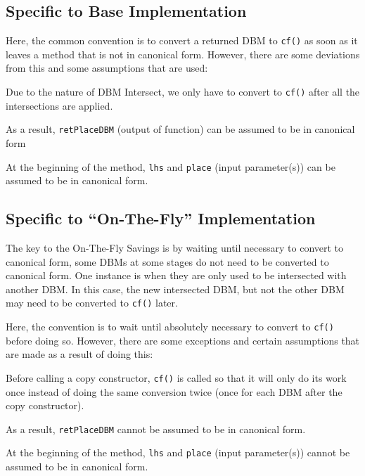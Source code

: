 \documentclass[11pt]{article}
\begin{document}
\subsection{Specific to Base Implementation}

	Here, the common convention is to convert a returned DBM to \texttt{cf()} as soon as it leaves a method that is not in canonical form.  However, there are some deviations from this and some assumptions that are used:
	
	\begin{enumeratepf}
		\item Due to the nature of DBM Intersect, we only have to convert to \texttt{cf()} after all the intersections are applied.
		\item As a result, \texttt{retPlaceDBM} (output of function) can be assumed to be in canonical form
		\item At the beginning of the method, \texttt{lhs} and \texttt{place} (input parameter(s)) can be assumed to be in canonical form.
	\end{enumeratepf}

\subsection{Specific to ``On-The-Fly'' Implementation}
	The key to the On-The-Fly Savings is by waiting until necessary to convert to canonical form, some DBMs at some stages do not need to be converted to canonical form.  One instance is when they are only used to be intersected with another DBM.  In this case, the new intersected DBM, but not the other DBM may need to be converted to \texttt{cf()} later. \parspc
	
	Here, the convention is to wait until absolutely necessary to convert to \texttt{cf()} before doing so.  However, there are some exceptions and certain assumptions that are made as  a result of doing this:
	
	\begin{enumeratepf}
		\item Before calling a copy constructor, \texttt{cf()} is called so that it will only do its work once instead of doing the same conversion twice (once for each DBM after the copy constructor).
		\item As a result, \texttt{retPlaceDBM} cannot be assumed to be in canonical form.
		\item At the beginning of the method, \texttt{lhs} and \texttt{place} (input parameter(s)) cannot be assumed to be in canonical form.
	\end{enumeratepf}
\end{document}
